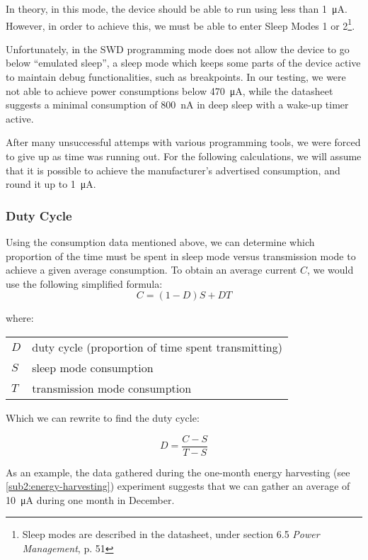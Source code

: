 In theory, in this mode, the device should be able to run using less than
\SI{1}{\micro\ampere}. However, in order to achieve this, we must be able to
enter Sleep Modes 1 or 2\footnote{Sleep modes are described in the datasheet,
under section 6.5 \emph{Power Management}, p. 51}.

Unfortunately, in the SWD programming mode does not allow the device to go below
``emulated sleep'', a sleep mode which keeps some parts of the device active to
maintain debug functionalities, such as breakpoints. In our testing, we were not
able to achieve power consumptions below \SI{470}{\micro\ampere}, while the
datasheet suggests a minimal consumption of \SI{800}{nA} in deep sleep with
a wake-up timer active.

After many unsuccessful attemps with various programming tools, we were forced
to give up as time was running out. For the following calculations, we will
assume that it is possible to achieve the manufacturer's advertised consumption,
and round it up to \SI{1}{\micro\ampere}.

\subsubsection{Duty Cycle}

Using the consumption data mentioned above, we can determine which proportion of
the time must be spent in sleep mode versus transmission mode to achieve a given
average consumption. To obtain an average current $C$, we would use the
following simplified formula:
\begin{equation*}
  C = (1 - D) S + D T
\end{equation*}

where:

\begin{tabular}[h!]{ll}
$D$   & duty cycle (proportion of time spent transmitting)  \\
$S$   & sleep mode consumption  \\
$T$   & transmission mode consumption \\
\end{tabular}

Which we can rewrite to find the duty cycle:

\begin{equation*}
  D = \frac{C-S}{T-S}
\end{equation*}

As an example, the data gathered during the one-month energy harvesting (see
\autoref{sub2:energy-harvesting}) experiment suggests that we can gather an
average of \SI{10}{\micro\ampere} during one month in December. 

